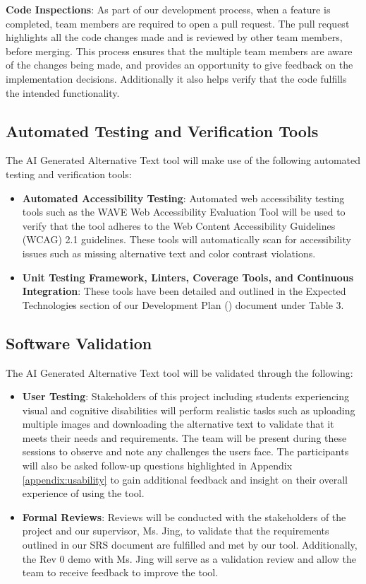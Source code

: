 \documentclass[12pt, titlepage]{article}
\begin{document}
\textbf{Code Inspections}:
As part of our development process, when a feature is completed, team
members are required to open a pull request. The pull request
highlights all the code changes made and is reviewed by other team
members, before merging.
This process ensures that the multiple team members are aware of the
changes being made, and provides an opportunity to give feedback on
the implementation decisions. Additionally it also helps verify that
the code fulfills the intended functionality.

\subsection{Automated Testing and Verification Tools}
The AI Generated Alternative Text tool will make use of the following
automated testing and verification tools:
\begin{itemize}
  \item \textbf{Automated Accessibility Testing}: Automated web
    accessibility testing tools such as the WAVE Web Accessibility
    Evaluation Tool will be used to
    verify that the tool adheres to the Web Content Accessibility
    Guidelines (WCAG) 2.1 guidelines. These tools will automatically
    scan for accessibility issues such as missing alternative text
    and color contrast violations.
  \item \textbf{Unit Testing Framework, Linters, Coverage Tools, and
    Continuous Integration}: These tools have been detailed and
    outlined in the Expected Technologies section
    of our Development Plan (\citet{DP}) document under Table 3.
\end{itemize}

\subsection{Software Validation}
The AI Generated Alternative Text tool will be validated through the following:
\begin{itemize}
  \item \textbf{User Testing}: Stakeholders of this project including students experiencing visual 
  and cognitive disabilities will perform realistic tasks such as uploading multiple images and downloading the alternative text
to validate that it meets their needs and requirements. 
  The team will be present during these sessions to observe and note any challenges 
  the users face. The participants will also be asked follow-up questions highlighted in Appendix \ref{appendix:usability} to gain additional feedback and insight
  on their overall experience of using the tool. 
  \item \textbf{Formal Reviews}: Reviews will be conducted with the stakeholders of the project and our supervisor, Ms. Jing, to validate that the requirements
  outlined in our SRS document are fulfilled and met by our tool. Additionally, the Rev 0 demo with Ms. Jing will serve as a validation review and allow the team 
  to receive feedback to improve the tool. 
\end{itemize} 
\end{document}

